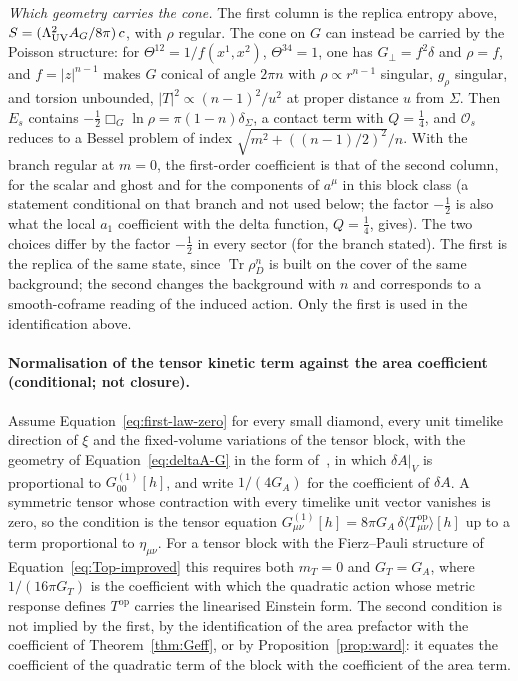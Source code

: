 \emph{Which geometry carries the cone.} The first column is the replica entropy above, \(S=(\Lambda_{\mathrm{UV}}^2A_G/8\pi)\,c\), with \(\rho\) regular. The cone on \(G\) can instead be carried by the Poisson structure: for \(\Theta^{12}=1/f(x^1,x^2)\), \(\Theta^{34}=1\), one has \(G_\perp=f^2\delta\) and \(\rho=f\), and \(f=|z|^{n-1}\) makes \(G\) conical of angle \(2\pi n\) with \(\rho\propto r^{n-1}\) singular, \(g_\rho\) singular, and torsion unbounded, \(|T|^2\propto(n-1)^2/u^2\) at proper distance \(u\) from \(\Sigma\). Then \(E_s\) contains \(-\tfrac12\Box_G\ln\rho=\pi(1-n)\delta_\Sigma\), a contact term with \(Q=\tfrac14\), and \(\mathcal O_s\) reduces to a Bessel problem of index \(\sqrt{m^2+((n-1)/2)^2}/n\). With the branch regular at \(m=0\), the first-order coefficient is that of the second column, for the scalar and ghost and for the components of \(a^\mu\) in this block class (a statement conditional on that branch and not used below; the factor \(-\tfrac12\) is also what the local \(a_1\) coefficient with the delta function, \(Q=\tfrac14\), gives). The two choices differ by the factor \(-\tfrac12\) in every sector (for the branch stated). The first is the replica of the same state, since \(\operatorname{Tr}\rho_D^n\) is built on the cover of the same background; the second changes the background with \(n\) and corresponds to a smooth-coframe reading of the induced action. Only the first is used in the identification above.

\paragraph{Normalisation of the tensor kinetic term against the area coefficient (conditional; not closure).}
Assume Equation~\eqref{eq:first-law-zero} for every small diamond, every unit timelike direction of \(\xi\) and the fixed-volume variations of the tensor block, with the geometry of Equation~\eqref{eq:deltaA-G} in the form of~\cite{Jacobson2016}, in which \(\delta A|_V\) is proportional to \(G^{(1)}_{00}[h]\), and write \(1/(4G_A)\) for the coefficient of \(\delta A\). A symmetric tensor whose contraction with every timelike unit vector vanishes is zero, so the condition is the tensor equation \(G^{(1)}_{\mu\nu}[h]=8\pi G_A\,\delta\langle T^{\mathrm{op}}_{\mu\nu}\rangle[h]\) up to a term proportional to \(\eta_{\mu\nu}\). For a tensor block with the Fierz--Pauli structure of Equation~\eqref{eq:Top-improved} this requires both \(m_T=0\) and \(G_T=G_A\), where \(1/(16\pi G_T)\) is the coefficient with which the quadratic action whose metric response defines \(T^{\mathrm{op}}\) carries the linearised Einstein form. The second condition is not implied by the first, by the identification of the area prefactor with the coefficient of Theorem~\ref{thm:Geff}, or by Proposition~\ref{prop:ward}: it equates the coefficient of the quadratic term of the block with the coefficient of the area term.


